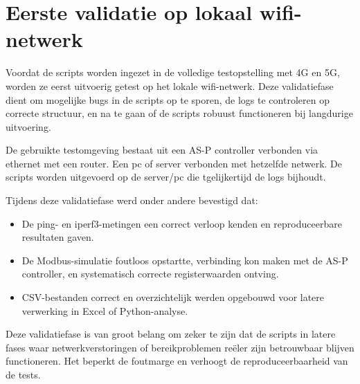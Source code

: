 \section{Eerste validatie op lokaal wifi-netwerk}

Voordat de scripts worden ingezet in de volledige testopstelling met 4G en 5G, worden ze eerst uitvoerig getest op het lokale wifi-netwerk. Deze validatiefase dient om mogelijke bugs in de scripts op te sporen, de logs te controleren op correcte structuur, en na te gaan of de scripts robuust functioneren bij langdurige uitvoering.

De gebruikte testomgeving bestaat uit een AS-P controller verbonden via ethernet met een router. Een pc of server verbonden met hetzelfde netwerk. De scripts worden uitgevoerd op de server/pc die  tgelijkertijd de logs bijhoudt.

Tijdens deze validatiefase werd onder andere bevestigd dat:
\begin{itemize}
    \item De ping- en iperf3-metingen een correct verloop kenden en reproduceerbare resultaten gaven.
    \item De Modbus-simulatie foutloos opstartte, verbinding kon maken met de AS-P controller, en systematisch correcte registerwaarden ontving.
    \item CSV-bestanden correct en overzichtelijk werden opgebouwd voor latere verwerking in Excel of Python-analyse.
\end{itemize}

Deze validatiefase is van groot belang om zeker te zijn dat de scripts in latere fases waar netwerkverstoringen of bereikproblemen reëler zijn betrouwbaar blijven functioneren. Het beperkt de foutmarge en verhoogt de reproduceerbaarheid van de tests.
